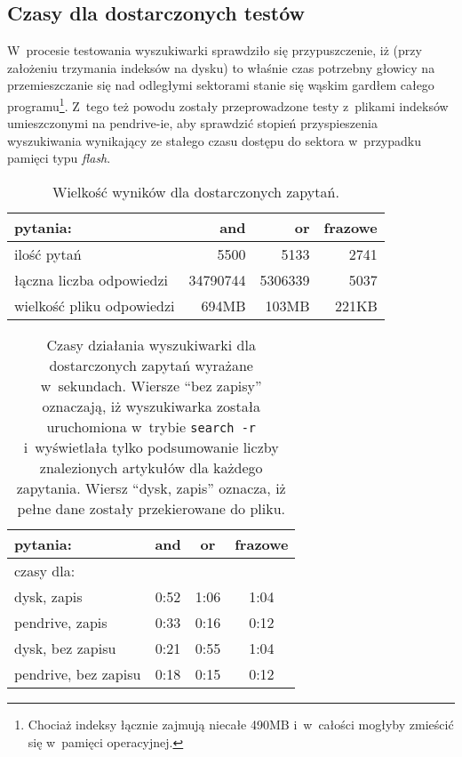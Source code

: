 \documentclass[a4paper,12pt]{article}
\begin{document}
\subsection{Czasy dla dostarczonych testów}

W~procesie testowania wyszukiwarki sprawdziło się przypuszczenie, iż (przy
założeniu trzymania indeksów na dysku) to właśnie czas potrzebny głowicy na
przemieszczanie się nad odległymi sektorami stanie się wąskim gardłem
całego programu\footnote{Chociaż indeksy łącznie zajmują niecałe 490MB
i~w~całości mogłyby zmieścić się w~pamięci operacyjnej.}. Z~tego też powodu
zostały przeprowadzone testy z~plikami indeksów umieszczonymi na pendrive-ie,
aby sprawdzić stopień przyspieszenia wyszukiwania wynikający ze stałego czasu
dostępu do sektora w~przypadku pamięci typu \textit{flash}.

\begin{center}
	\begin{table}
		\begin{tabular}[c]{| l || r | r | r |}
		\hline
		pytania: & and & or & frazowe \\ \hline \hline
		ilość pytań & 5500 & 5133 & 2741 \\ \hline
		łączna liczba odpowiedzi & 34790744 & 5306339 & 5037 \\ \hline
		wielkość pliku odpowiedzi & 694MB & 103MB & 221KB \\
		\hline
		\end{tabular}
		\caption{Wielkość wyników dla dostarczonych zapytań.}
	\end{table}
\end{center}

\begin{center}
	\begin{table}
		\begin{tabular}[c]{| l || c | c | c |}
		\hline
		pytania: & and & or & frazowe \\ \hline \hline
		czasy dla: & \multicolumn{3}{|l|}{} \\ \hline
		dysk, zapis & 0:52 & 1:06 & 1:04 \\ \hline
		pendrive, zapis & 0:33 & 0:16 & 0:12 \\
		dysk, bez zapisu & 0:21 & 0:55 & 1:04 \\ \hline
		pendrive, bez zapisu & 0:18 & 0:15 & 0:12 \\
		\hline
		\end{tabular}
		\caption{Czasy działania wyszukiwarki dla dostarczonych zapytań
		wyrażane w~sekundach.  Wiersze ``bez zapisy'' oznaczają, iż
		wyszukiwarka została uruchomiona w~trybie \texttt{search -r}
		i~wyświetlała tylko podsumowanie liczby znalezionych artykułów dla
		każdego zapytania. Wiersz ``dysk, zapis'' oznacza, iż pełne dane
		zostały przekierowane do pliku.}
	\end{table}
\end{center}
\end{document}
